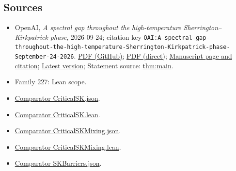 \documentclass[11pt]{article}
\begin{document}
\subsection{Sources}
\begin{itemize}
\item OpenAI, \emph{A spectral gap throughout the high-temperature Sherrington–Kirkpatrick phase}, 2026-09-24; citation key \texttt{OAI:A-spectral-gap-throughout-the-high-temperature-Sherrington-Kirkpatrick-phase-September-24-2026}. \href{https://github.com/openai/math/blob/adc7f1241b42e322a6451854ab7e4b4c146bf78a/preprints/A-spectral-gap-throughout-the-high-temperature-Sherrington-Kirkpatrick-phase-September-24-2026/main.pdf}{PDF (GitHub)}; \href{https://github.com/openai/math/raw/adc7f1241b42e322a6451854ab7e4b4c146bf78a/preprints/A-spectral-gap-throughout-the-high-temperature-Sherrington-Kirkpatrick-phase-September-24-2026/main.pdf}{PDF (direct)}; \href{https://github.com/openai/math/blob/adc7f1241b42e322a6451854ab7e4b4c146bf78a/preprints/A-spectral-gap-throughout-the-high-temperature-Sherrington-Kirkpatrick-phase-September-24-2026/README.md}{Manuscript page and citation}; \href{https://github.com/openai/math/blob/main/preprints/A-spectral-gap-throughout-the-high-temperature-Sherrington-Kirkpatrick-phase-September-24-2026/main.pdf}{Latest version}; Statement source: \href{https://github.com/openai/math/blob/adc7f1241b42e322a6451854ab7e4b4c146bf78a/preprints/A-spectral-gap-throughout-the-high-temperature-Sherrington-Kirkpatrick-phase-September-24-2026/build/sections/introduction.tex\#L33}{thm:main}.
\item Family 227: \href{https://github.com/openai/math/blob/adc7f1241b42e322a6451854ab7e4b4c146bf78a/lean/docs/227.md}{Lean scope}.
\item \href{https://github.com/openai/math/blob/adc7f1241b42e322a6451854ab7e4b4c146bf78a/lean/ComparatorChallenges/CriticalSK.json}{Comparator CriticalSK.json}.
\item \href{https://github.com/openai/math/blob/adc7f1241b42e322a6451854ab7e4b4c146bf78a/lean/ComparatorChallenges/CriticalSK.lean}{Comparator CriticalSK.lean}.
\item \href{https://github.com/openai/math/blob/adc7f1241b42e322a6451854ab7e4b4c146bf78a/lean/ComparatorChallenges/CriticalSKMixing.json}{Comparator CriticalSKMixing.json}.
\item \href{https://github.com/openai/math/blob/adc7f1241b42e322a6451854ab7e4b4c146bf78a/lean/ComparatorChallenges/CriticalSKMixing.lean}{Comparator CriticalSKMixing.lean}.
\item \href{https://github.com/openai/math/blob/adc7f1241b42e322a6451854ab7e4b4c146bf78a/lean/ComparatorChallenges/SKBarriers.json}{Comparator SKBarriers.json}.

\end{itemize}
\end{document}
